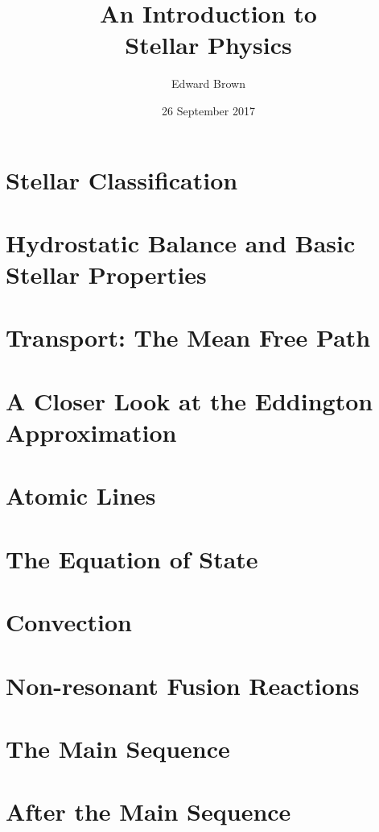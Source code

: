 \documentclass[profonts,stix,symmetric]{astro-bookshelf}
\title{An Introduction to\\ Stellar Physics}
\author{Edward Brown}
\date{26 September 2017}
\begin{document}
\frontmatter
{}


\mainmatter
{}
\setcounter{page}{1}

\chapter{Stellar Classification}\label{ch.classifying-stars}


\chapter{Hydrostatic Balance and Basic Stellar Properties}\label{ch.hydrostatic-balance}


\chapter{Transport: The Mean Free Path}\label{ch.mean-free-path}


\chapter{A Closer Look at the Eddington Approximation}\label{ch.stellar-atmospheres}


\chapter{Atomic Lines}\label{ch.atomic-lines}


\chapter{The Equation of State}\label{ch.degeneracy}


\chapter{Convection}\label{ch.convection}


\chapter{Non-resonant Fusion Reactions}\label{ch.nuclear-burning}


\chapter{The Main Sequence}\label{ch.main-sequence}


\chapter{After the Main Sequence}\label{ch.post-main-sequence}



\backmatter


\end{document}
